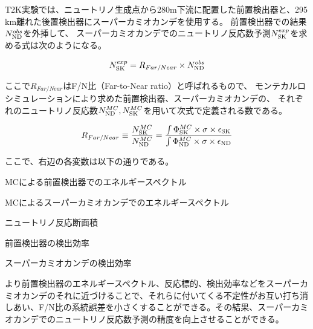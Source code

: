 T2K実験では、ニュートリノ生成点から280m下流に配置した前置検出器と、295 km離れた後置検出器にスーパーカミオカンデを使用する。
前置検出器での結果$N_{\mathrm{ND}}^{obs}$を外挿して、
スーパーカミオカンデでのニュートリノ反応数予測$N_{\mathrm{SK}}^{exp}$を求める式は次のようになる。

\begin{equation}
N_{\mathrm{SK}}^{exp}  =  R_{Far/Near} \times N_{\mathrm{ND}}^{obs}
\label{Extrapolation}
\end{equation}

ここで$R_{Far/Near}$はF/N比（Far-to-Near ratio）と呼ばれるもので、
モンテカルロシミュレーションにより求めた前置検出器、スーパーカミオカンデの、
それぞれのニュートリノ反応数$N_{\mathrm{ND}}^{MC}, N_{\mathrm{SK}}^{MC}$を用いて次式で定義される数である。

\begin{equation}
R_{Far/Near} \equiv \frac{N_{\mathrm{SK}}^{MC}}{N_{\mathrm{ND}}^{MC}} = \frac{\int \Phi_{\mathrm{SK}}^{MC} \times \sigma \times \epsilon_{\mathrm{SK}}}{\int \Phi_{\mathrm{ND}}^{MC} \times \sigma \times \epsilon_{\mathrm{ND}}}
\label{FN}
\end{equation}

ここで、右辺の各変数は以下の通りである。


\begin{description}[%
    labelindent=5\zw,
    labelsep=3\zw,
    ]
    \item [$\Phi_{\nd}^{MC}$] MCによる前置検出器でのエネルギースペクトル
    \item [$\Phi_{\sk}^{MC}$] MCによるスーパーカミオカンデでのエネルギースペクトル
    \item [$\sigma$] ニュートリノ反応断面積
    \item [$\epsilon_{\nd}$] 前置検出器の検出効率
    \item [$\epsilon_{\sk}$] スーパーカミオカンデの検出効率
\end{description}

より前置検出器のエネルギースペクトル、反応標的、検出効率などをスーパーカミオカンデのそれに近づけることで、それらに付いてくる不定性がお互い打ち消しあい、F/N比の系統誤差を小さくすることができる。その結果、スーパーカミオカンデでのニュートリノ反応数予測の精度を向上させることができる。



